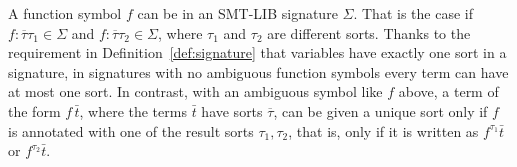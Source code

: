 
A function symbol $f$ can be 
in an SMT-LIB signature $\Sigma$.
That is the case if $f:\overline{\tau}\tau_1 \in \Sigma$ and $f:\overline{\tau}\tau_2 \in \Sigma$, 
where $\tau_1$ and $\tau_2$ are different sorts.
Thanks to the requirement in Definition~\ref{def:signature} that
variables have exactly one sort in a signature,
in signatures with no ambiguous function symbols
every term can have at most one sort.
In contrast,
with an ambiguous symbol like $f$ above,
a term of the form $f\, \bar{t}$,
where the terms $\bar t$ have sorts $\overline \tau$, can be given 
a unique sort only if $f$ is annotated with one of the result sorts $\tau_1, \tau_2$,
that is, only if it is written as $f^{\tau_1}\bar{t}$ or $f^{\tau_2}\bar{t}$. 


